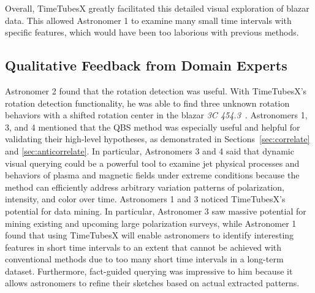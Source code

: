 Overall, TimeTubesX greatly facilitated this detailed visual exploration of blazar data. This allowed Astronomer 1 to examine many small time intervals with specific features, which would have been too laborious with previous methods.


\subsection{Qualitative Feedback from Domain Experts}\label{sec:feedback}
Astronomer 2 found that the rotation detection was useful. 
With TimeTubesX's rotation detection functionality, 
he was able to find three unknown rotation behaviors with a shifted rotation center in the blazar \emph{3C 454.3}~\cite{Huang2019}. 
Astronomers 1, 3, and 4 mentioned that the QBS method was especially useful and helpful for validating their high-level hypotheses, as demonstrated in Sections~\ref{sec:correlate} and \ref{sec:anticorrelate}. 
In particular, Astronomers 3 and 4 said that dynamic visual querying could be a powerful tool to examine jet physical processes and behaviors of plasma and magnetic fields under extreme conditions because the method can efficiently address arbitrary variation patterns of polarization, intensity, and color over time. Astronomers 1 and 3 noticed TimeTubesX’s potential for data mining. In particular, Astronomer 3 saw massive potential for mining existing and upcoming large polarization surveys, while Astronomer 1 found that using TimeTubesX will enable astronomers to identify interesting features in short time intervals to an extent that cannot be achieved with conventional methods due to too many short time intervals in a long-term dataset. Furthermore, fact-guided querying was impressive to him because it allows astronomers to refine their sketches based on actual extracted patterns.

